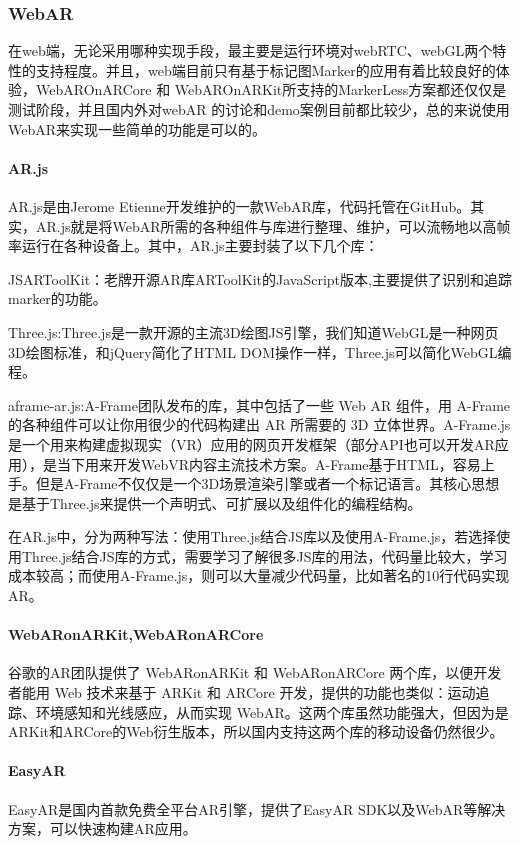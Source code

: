 \documentclass{article}
\begin{document}
\subsubsection{WebAR}
在web端，无论采用哪种实现手段，最主要是运行环境对webRTC、webGL两个特性的支持程度。并且，web端目前只有基于标记图Marker的应用有着比较良好的体验，WebAROnARCore 和 WebAROnARKit所支持的MarkerLess方案都还仅仅是测试阶段，并且国内外对webAR 的讨论和demo案例目前都比较少，总的来说使用WebAR来实现一些简单的功能是可以的。\par
\paragraph{AR.js}
AR.js是由Jerome Etienne开发维护的一款WebAR库，代码托管在GitHub。其实，AR.js就是将WebAR所需的各种组件与库进行整理、维护，可以流畅地以高帧率运行在各种设备上。其中，AR.js主要封装了以下几个库：\par
JSARToolKit：老牌开源AR库ARToolKit的JavaScript版本,主要提供了识别和追踪 marker的功能。\par
Three.js:Three.js是一款开源的主流3D绘图JS引擎，我们知道WebGL是一种网页3D绘图标准，和jQuery简化了HTML DOM操作一样，Three.js可以简化WebGL编程。\par
aframe-ar.js:A-Frame团队发布的库，其中包括了一些 Web AR 组件，用 A-Frame 的各种组件可以让你用很少的代码构建出 AR 所需要的 3D 立体世界。A-Frame.js是一个用来构建虚拟现实（VR）应用的网页开发框架（部分API也可以开发AR应用），是当下用来开发WebVR内容主流技术方案。A-Frame基于HTML，容易上手。但是A-Frame不仅仅是一个3D场景渲染引擎或者一个标记语言。其核心思想是基于Three.js来提供一个声明式、可扩展以及组件化的编程结构。\par
在AR.js中，分为两种写法：使用Three.js结合JS库以及使用A-Frame.js，若选择使用Three.js结合JS库的方式，需要学习了解很多JS库的用法，代码量比较大，学习成本较高；而使用A-Frame.js，则可以大量减少代码量，比如著名的10行代码实现AR。\par
\paragraph{WebARonARKit,WebARonARCore}
谷歌的AR团队提供了 WebARonARKit 和 WebARonARCore 两个库，以便开发者能用 Web 技术来基于 ARKit 和 ARCore 开发，提供的功能也类似：运动追踪、环境感知和光线感应，从而实现 WebAR。这两个库虽然功能强大，但因为是ARKit和ARCore的Web衍生版本，所以国内支持这两个库的移动设备仍然很少。\par
\paragraph{EasyAR}
EasyAR是国内首款免费全平台AR引擎，提供了EasyAR SDK以及WebAR等解决方案，可以快速构建AR应用。\par
\end{document}
